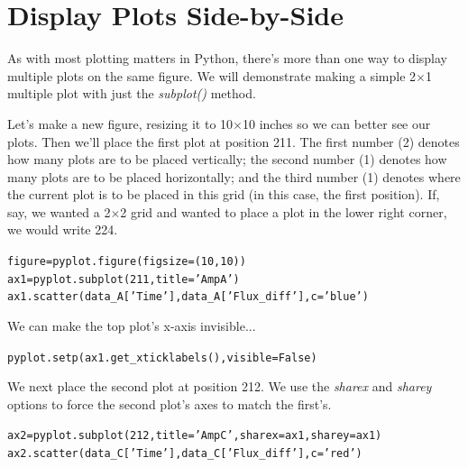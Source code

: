 


\section{Display Plots Side-by-Side}\label{s:mulitplots}

As with most plotting matters in Python, there's more than one way to 
display multiple plots on the same figure. We will demonstrate making
a simple 2$\times$1 multiple plot with just the \textit{subplot()} method. 

Let's make a new figure, resizing it to 10$\times$10 inches so we can better see our plots.
Then we'll place the first plot at position 211. The first number (2) denotes 
how many plots are to be placed vertically; the second number (1) denotes
how many plots are to be placed horizontally; and the third number (1) denotes
where the current plot is to be placed in this grid (in this case, the first position). 
If, say, we wanted a 2$\times$2 grid and wanted to place a plot in the lower right corner,
we would write 224.


\begin{alltt}
\pytab figure = pyplot.figure(figsize = (10,10))
\pytab ax1 = pyplot.subplot(211, title='Amp A')
\pytab ax1.scatter(data_A['Time'], data_A['Flux_diff'], c='blue')
\end{alltt}

We can make the top plot's x-axis invisible... 

\begin{alltt}
\pytab pyplot.setp(ax1.get_xticklabels(), visible=False)
\end{alltt}

We next place the second plot at position 212. We use the \textit{sharex} and \textit{sharey} options
to force the second plot's  axes to match the first's.

\begin{alltt}
\pytab ax2 = pyplot.subplot(212, title='Amp C', sharex=ax1, sharey=ax1)
\pytab ax2.scatter(data_C['Time'], data_C['Flux_diff'], c='red')
\end{alltt}

